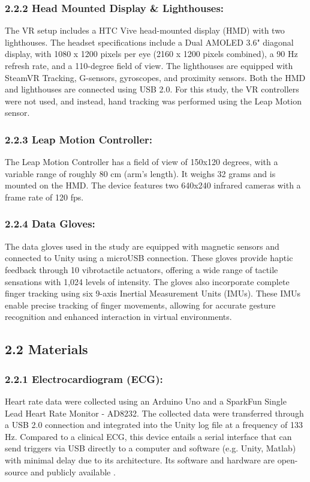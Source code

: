 \documentclass[12pt,oneside,openright]{report}
\begin{document}
\subsubsection*{2.2.2 Head Mounted Display \& Lighthouses:}
The VR setup includes a HTC Vive head-mounted display (HMD) with two lighthouses. The headset specifications include a Dual AMOLED 3.6" diagonal display, with 1080 x 1200 pixels per eye (2160 x 1200 pixels combined), a 90 Hz refresh rate, and a 110-degree field of view. The lighthouses are equipped with SteamVR Tracking, G-sensors, gyroscopes, and proximity sensors. Both the HMD and lighthouses are connected using USB 2.0. For this study, the VR controllers were not used, and instead, hand tracking was performed using the Leap Motion sensor.

\subsubsection*{2.2.3 Leap Motion Controller:}
The Leap Motion Controller has a field of view of 150x120 degrees, with a variable range of roughly 80 cm (arm's length). It weighs 32 grams and is mounted on the HMD. The device features two 640x240 infrared cameras with a frame rate of 120 fps.

\subsubsection*{2.2.4 Data Gloves:}
The data gloves used in the study are equipped with magnetic sensors and connected to Unity using a microUSB connection. These gloves provide haptic feedback through 10 vibrotactile actuators, offering a wide range of tactile sensations with 1,024 levels of intensity. The gloves also incorporate complete finger tracking using six 9-axis Inertial Measurement Units (IMUs). These IMUs enable precise tracking of finger movements, allowing for accurate gesture recognition and enhanced interaction in virtual environments.

\subsection*{2.2 Materials}
\subsubsection*{2.2.1 Electrocardiogram (ECG):}
Heart rate data were collected using an Arduino Uno and a SparkFun Single Lead Heart Rate Monitor - AD8232. The collected data were transferred through a USB 2.0 connection and integrated into the Unity log file at a frequency of 133 Hz. Compared to a clinical ECG, this device entails a serial interface that can send triggers via USB directly to a computer and software (e.g. Unity, Matlab) with minimal delay due to its architecture. Its software and hardware are open-source and publicly available \parencite{TimsECG}.
\end{document}
